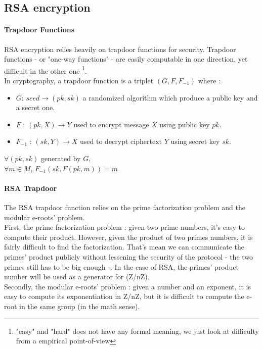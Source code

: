

\subsection{RSA encryption}


\paragraph{Trapdoor Functions}

RSA encryption relies heavily on trapdoor functions for security. Trapdoor functions - or "one-way functions" - are easily computable in one direction, yet difficult in the other one \footnote{"easy" and "hard" does not have any formal meaning, we just look at difficulty from a empirical point-of-view}. \\

In cryptography, a trapdoor function is a triplet $(G, F, F_{-1})$ where :
\begin{itemize}
	\item $G$: $ seed \rightarrow (pk, sk) $ a randomized algorithm which produce a public key and a secret one.
	\item $F$ : $ (pk, X) \rightarrow  Y $ used to encrypt message $X$ using public key $pk$.
	\item $F_{-1}$ : $ (sk, Y) \rightarrow X $ used to decrypt ciphertext $Y$ using secret key $sk$.
\end{itemize}

\begin{mytheorem}
	$\forall (pk,sk) $ generated by $G$, \\
	$\forall m \in M $, $F_{-1}( sk, F(pk, m) ) = m $
\end{mytheorem}

\paragraph{RSA Trapdoor}

The RSA trapdoor function relies on the prime factorization problem and the modular e-roots' problem. \\
First, the prime factorization problem : given two prime numbers, it's easy to compute their product. However, given the product of two primes numbers, it is fairly difficult to find the factorization. That's mean we can communicate the primes' product publicly without lessening the security of the protocol - the two primes still has to be big enough -. In the case of RSA, the primes' product number will be used as a generator for (Z/nZ).\\
Secondly, the modular e-roots' problem : given a number and an exponent, it is easy to compute its exponentiation in Z/nZ, but it is difficult to compute the e-root in the same group (in the math sense).

